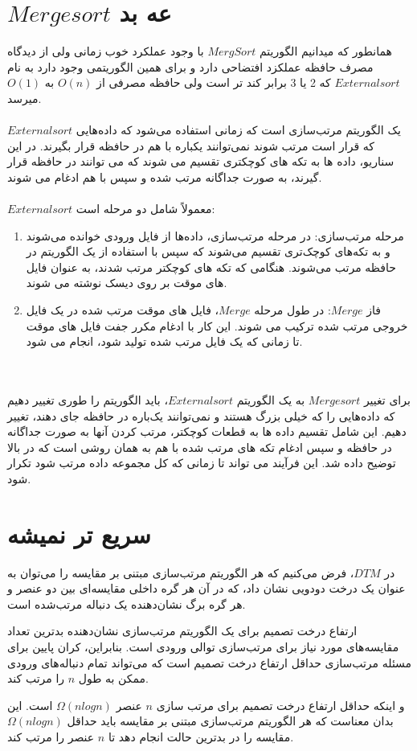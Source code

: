\documentclass[12pt]{article}
\begin{document}
\section{$Merge sort$ عه بد}
همانطور که میدانیم الگوریتم $Merg Sort$ با وجود عملکرد خوب زمانی ولی از دیدگاه مصرف حافظه عملکزد افتضاحی دارد و برای همین الگوریتمی وجود دارد به نام $External sort$ که 2 یا 3 برابر کند تر است ولی حافظه مصرفی از $O(n)$ به $O(1)$ میرسد.
\\
\\
$External sort$ یک الگوریتم مرتب‌سازی است که زمانی استفاده می‌شود که داده‌هایی که قرار است مرتب شوند نمی‌توانند یکباره با هم در حافظه قرار بگیرند. در این سناریو، داده ها به تکه های کوچکتری تقسیم می شوند که می توانند در حافظه قرار گیرند، به صورت جداگانه مرتب شده و سپس با هم ادغام می شوند.
\\
\\
$External sort$ معمولاً شامل دو مرحله است:
\begin{enumerate}
    \item مرحله مرتب‌سازی: در مرحله مرتب‌سازی، داده‌ها از فایل ورودی خوانده می‌شوند و به تکه‌های کوچک‌تری تقسیم می‌شوند که سپس با استفاده از یک الگوریتم در حافظه مرتب می‌شوند. هنگامی که تکه های کوچکتر مرتب شدند، به عنوان فایل های موقت بر روی دیسک نوشته می شوند.
    \item فاز $Merge$: در طول مرحله $Merge$، فایل های موقت مرتب شده در یک فایل خروجی مرتب شده ترکیب می شوند. این کار با ادغام مکرر جفت فایل های موقت تا زمانی که یک فایل مرتب شده تولید شود، انجام می شود.
\end{enumerate}
\\
\\
برای تغییر $Merge sort$ به یک الگوریتم $External sort$، باید الگوریتم را طوری تغییر دهیم که داده‌هایی را که خیلی بزرگ هستند و نمی‌توانند یک‌باره در حافظه جای دهند، تغییر دهیم. این شامل تقسیم داده ها به قطعات کوچکتر، مرتب کردن آنها به صورت جداگانه در حافظه و سپس ادغام تکه های مرتب شده با هم به همان روشی است که در بالا توضیح داده شد. این فرآیند می تواند تا زمانی که کل مجموعه داده مرتب شود تکرار شود.


\section{سریع تر نمیشه}
در $DTM$، فرض می‌کنیم که هر الگوریتم مرتب‌سازی مبتنی بر مقایسه را می‌توان به عنوان یک درخت دودویی نشان داد، که در آن هر گره داخلی مقایسه‌ای بین دو عنصر و هر گره برگ نشان‌دهنده یک دنباله مرتب‌شده است.

ارتفاع درخت تصمیم برای یک الگوریتم مرتب‌سازی نشان‌دهنده بدترین تعداد مقایسه‌های مورد نیاز برای مرتب‌سازی توالی ورودی است. بنابراین، کران پایین برای مسئله مرتب‌سازی حداقل ارتفاع درخت تصمیم است که می‌تواند تمام دنباله‌های ورودی ممکن به طول $n$ را مرتب کند.

و اینکه حداقل ارتفاع درخت تصمیم برای مرتب سازی $n$ عنصر $Ω (nlogn)$ است. این بدان معناست که هر الگوریتم مرتب‌سازی مبتنی بر مقایسه باید حداقل $Ω(nlogn)$ مقایسه را در بدترین حالت انجام دهد تا $n$ عنصر را مرتب کند.
\end{document}
